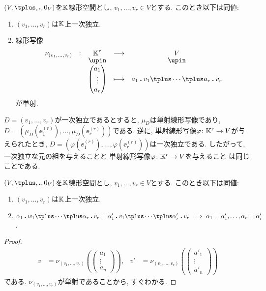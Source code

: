 \begin{prop}
  $(V,\plus,\act,0_V)$を$\mathbb{K}$線形空間とし,
  $v_1,\ldots,v_r\in V$とする.
  このとき以下は同値:
  \begin{enumerate}
  \item $(v_1,\ldots,v_r)$は$\mathbb{K}$上一次独立.
  \item 線形写像
    \begin{align*}
      \shazo{\nu_{(v_1,\ldots,v_r)}}{\KK^r}{V}
      {\begin{pmatrix}a_1\\\vdots\\a_r\end{pmatrix}}{a_1\act v_1\plus\cdots\plus a_r\act v_r}
    \end{align*}
    が単射.
  \end{enumerate}
\end{prop}

\begin{remark}
  $D=(v_1,\ldots,v_r)$が一次独立であるとすると,
  $\mu_D$は単射線形写像であり,
  $D=(\mu_D(\ee^{(r)}_1),\ldots,\mu_D(\ee^{(r)}_r))$である.
  逆に, 単射線形写像$\varphi\colon \mathbb{K}^r\to V$が与えられたとき,
  $D=(\varphi(\ee^{(r)}_1),\ldots,\varphi(\ee^{(r)}_r))$は一次独立である.
  したがって,
  一次独立な元の組を与えることと
  単射線形写像$\varphi\colon \mathbb{K}^r\to V$を与えること
  は同じことである.
\end{remark}

\begin{prop}
  $(V,\plus,\act,0_V)$を$\mathbb{K}$線形空間とし,
  $v_1,\ldots,v_r\in V$とする.
  このとき以下は同値:
  \begin{enumerate}
  \item $(v_1,\ldots,v_r)$は$\mathbb{K}$上一次独立.
  \item $\alpha_1\act w_1\plus\cdots\plus \alpha_r\act v_r=\alpha'_1\act v_1\plus\cdots\plus \alpha'_r\act v_r \implies \alpha_1=\alpha'_1,\ldots,\alpha_r=\alpha'_r$.
  \end{enumerate}
\end{prop}
\begin{proof}
\begin{align*}
v&=\nu_{(v_1,\ldots,v_r)}(\begin{pmatrix}a_1\\\vdots\\a_n\end{pmatrix}), &
v'&=\nu_{(v_1,\ldots,v_r)}(\begin{pmatrix}a'_1\\\vdots\\a'_n\end{pmatrix}) 
\end{align*}
である. $\nu_{(v_1,\ldots,v_r)}$が単射であることから, すぐわかる.
\end{proof}

